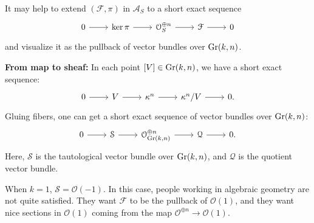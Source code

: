 \begin{remark}
It may help to extend $(\mathcal{F},\pi)$ in $\mathcal{A}_S$ to a short exact sequence
\[\begin{tikzcd}[column sep=2.25em]
	0 & {\ker \pi} & {\mathcal{O}_S^{\oplus n}} & {\mathcal{F}} & 0
	\arrow[from=1-1, to=1-2]
	\arrow[from=1-2, to=1-3]
	\arrow[from=1-3, to=1-4]
	\arrow[from=1-4, to=1-5]
\end{tikzcd}\]
and visualize it as the pullback of vector bundles over $\operatorname{Gr}(k,n)$.

\textbf{From map to sheaf:}
In each point $[V] \in \operatorname{Gr}(k,n)$, we have a short exact sequence:
\[\begin{tikzcd}[column sep=2.25em]
	0 & V & {\kappa^n} & {\kappa^n/V} & 0. 
	\arrow[from=1-1, to=1-2]
	\arrow[from=1-2, to=1-3]
	\arrow[from=1-3, to=1-4]
	\arrow[from=1-4, to=1-5]
\end{tikzcd}\]
Gluing fibers, one can get a short exact sequence of vector bundles over $\operatorname{Gr}(k,n)$:
\begin{equation}\label{eq:canonical_ses_over_Gr}
\begin{tikzcd}[column sep=2.25em]
	0 & {\mathcal{S}} & {\mathcal{O}_{\Gr(k,n)}^{\oplus n}} & {\mathcal{Q}} & 0.
	\arrow[from=1-1, to=1-2]
	\arrow[from=1-2, to=1-3]
	\arrow[from=1-3, to=1-4]
	\arrow[from=1-4, to=1-5]
\end{tikzcd}
\end{equation}
Here, $\mathcal{S}$ is the tautological vector bundle over $\operatorname{Gr}(k,n)$, and ${\mathcal{Q}}$ is the quotient vector bundle. 

When $k=1$, $\mathcal{S} = \mathcal{O}(-1)$. In this case, people working in algebraic geometry are not quite satisfied. They want $\mathcal{F}$ to be the pullback of $\mathcal{O}(1)$, and they want nice sections in $\mathcal{O}(1)$ coming from the map $\mathcal{O}^{\oplus n} \longrightarrow \mathcal{O}(1)$.


\end{remark}
